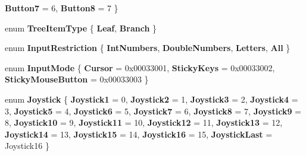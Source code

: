 \begin{DoxyCompactItemize}
{\bfseries Button7} = 6, 
\newline
{\bfseries Button8} = 7
 \}
\item 
\mbox{\label{namespace_space_v_i_l_1_1_core_a9c1c7992b81d7757eeeb5a06f38a9cd8}} 
enum {\bfseries Tree\+Item\+Type} \{ {\bfseries Leaf}, 
{\bfseries Branch}
 \}
\item 
\mbox{\label{namespace_space_v_i_l_1_1_core_a5ff993525e2c3b4af77288fa58f6ac9c}} 
enum {\bfseries Input\+Restriction} \{ {\bfseries Int\+Numbers}, 
{\bfseries Double\+Numbers}, 
{\bfseries Letters}, 
{\bfseries All}
 \}
\item 
\mbox{\label{namespace_space_v_i_l_1_1_core_a3e33a8b7a8b18bfc4a11d787eb5be264}} 
enum {\bfseries Input\+Mode} \{ {\bfseries Cursor} = 0x00033001, 
{\bfseries Sticky\+Keys} = 0x00033002, 
{\bfseries Sticky\+Mouse\+Button} = 0x00033003
 \}
\item 
\mbox{\label{namespace_space_v_i_l_1_1_core_acc8ea0fd87ec89b4cc0f546c6f4887d9}} 
enum {\bfseries Joystick} \{ \newline
{\bfseries Joystick1} = 0, 
{\bfseries Joystick2} = 1, 
{\bfseries Joystick3} = 2, 
{\bfseries Joystick4} = 3, 
\newline
{\bfseries Joystick5} = 4, 
{\bfseries Joystick6} = 5, 
{\bfseries Joystick7} = 6, 
{\bfseries Joystick8} = 7, 
\newline
{\bfseries Joystick9} = 8, 
{\bfseries Joystick10} = 9, 
{\bfseries Joystick11} = 10, 
{\bfseries Joystick12} = 11, 
\newline
{\bfseries Joystick13} = 12, 
{\bfseries Joystick14} = 13, 
{\bfseries Joystick15} = 14, 
{\bfseries Joystick16} = 15, 
\newline
{\bfseries Joystick\+Last} = Joystick16
 \}
\end{DoxyCompactItemize}
